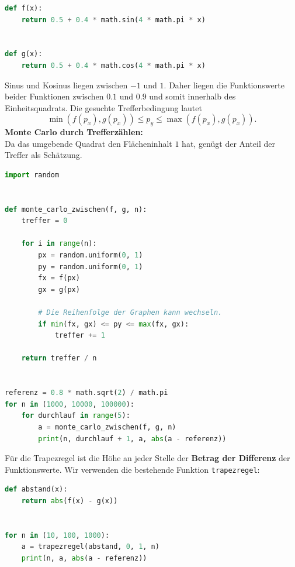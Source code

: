 \begin{myexercise}
\begin{lstlisting}[language=Python]
def f(x):
    return 0.5 + 0.4 * math.sin(4 * math.pi * x)


def g(x):
    return 0.5 + 0.4 * math.cos(4 * math.pi * x)
\end{lstlisting}

\begin{myanswer}
Sinus und Kosinus liegen zwischen $-1$ und $1$. Daher liegen die Funktionswerte beider Funktionen zwischen $0.1$ und $0.9$ und somit innerhalb des Einheitsquadrats.
Die gesuchte Trefferbedingung lautet
\[
    \min(f(p_x),g(p_x))\leq p_y\leq\max(f(p_x),g(p_x)).
\]
\textbf{Monte Carlo durch Trefferzählen:}\\
Da das umgebende Quadrat den Flächeninhalt $1$ hat, genügt der Anteil der Treffer als Schätzung.

\begin{lstlisting}[language=Python, caption={Monte Carlo für die Fläche zwischen zwei Graphen}]
import random


def monte_carlo_zwischen(f, g, n):
    treffer = 0

    for i in range(n):
        px = random.uniform(0, 1)
        py = random.uniform(0, 1)
        fx = f(px)
        gx = g(px)

        # Die Reihenfolge der Graphen kann wechseln.
        if min(fx, gx) <= py <= max(fx, gx):
            treffer += 1

    return treffer / n


referenz = 0.8 * math.sqrt(2) / math.pi
for n in (1000, 10000, 100000):
    for durchlauf in range(5):
        a = monte_carlo_zwischen(f, g, n)
        print(n, durchlauf + 1, a, abs(a - referenz))
\end{lstlisting}

Für die Trapezregel ist die Höhe an jeder Stelle der \textbf{Betrag der Differenz} der Funktionswerte. Wir verwenden die bestehende Funktion \lstinline|trapezregel|:
\begin{lstlisting}[language=Python, caption={Trapezregel für den Abstand der Graphen}]
def abstand(x):
    return abs(f(x) - g(x))


for n in (10, 100, 1000):
    a = trapezregel(abstand, 0, 1, n)
    print(n, a, abs(a - referenz))
\end{lstlisting}


\end{myanswer}
\end{myexercise}
